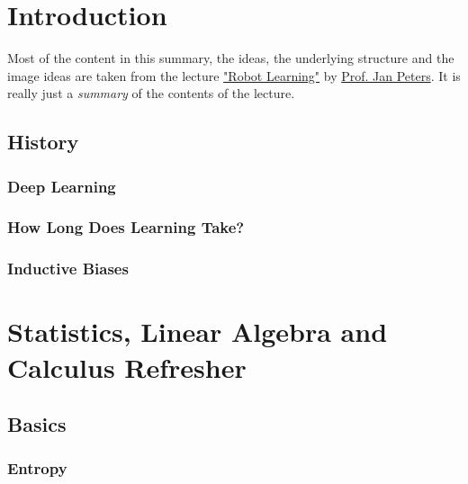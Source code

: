 \lstset{language = Python}



\chapter{Introduction} %
	Most of the content in this summary, the ideas, the underlying structure and the image ideas are taken from the lecture \href{https://www.ias.informatik.tu-darmstadt.de/Teaching/RobotLearningLecture}{"Robot Learning"} by \href{https://www.ias.informatik.tu-darmstadt.de/Team/JanPeters}{Prof. Jan Peters}. It is really just a \emph{summary} of the contents of the lecture.


	\section{History} %

		\subsection{Deep Learning} %

		\subsection{How Long Does Learning Take?} %

		\subsection{Inductive Biases} %

\chapter{Statistics, Linear Algebra and Calculus Refresher} %

	\section{Basics} %

		\subsection{Entropy} %

